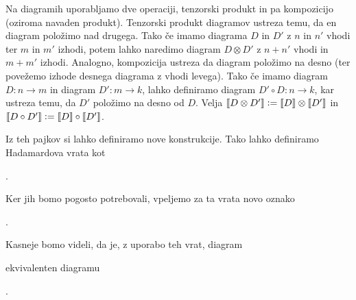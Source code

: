 \documentclass[mat1]{fmfdelo}
\newcommand{\interpret}[1]{\left\llbracket #1 \right\rrbracket}
\newcommand{\defeq}{\vcentcolon=}
\begin{document}
Na diagramih uporabljamo dve operaciji, tenzorski produkt in pa kompozicijo (oziroma navaden produkt). Tenzorski produkt diagramov ustreza temu, da en diagram položimo nad drugega. Tako če imamo diagrama \(D\) in \(D'\) z \(n\) in \(n'\) vhodi ter \(m\) in \(m'\) izhodi, potem lahko naredimo diagram \(D\otimes D'\) z \(n+n'\) vhodi in \(m+m'\) izhodi. Analogno, kompozicija ustreza da diagram položimo na desno (ter povežemo izhode desnega diagrama z vhodi levega). Tako če imamo diagram \(D:n\to m\) in diagram \(D':m\to k\), lahko definiramo diagram \(D'\circ D: n\to k\), kar ustreza temu, da \(D'\) položimo na desno od \(D\). Velja \(\interpret{D\otimes D'}\defeq \interpret{D} \otimes \interpret{D'}\) in \(\interpret{D\circ D'} \defeq \interpret{D}\circ \interpret{ D'}\).

Iz teh pajkov si lahko definiramo nove konstrukcije. Tako lahko definiramo Hadamardova vrata kot
\begin{center}
    .
\end{center}
Ker jih bomo pogosto potrebovali, vpeljemo za ta vrata novo oznako
\begin{center}
    .
\end{center}
Kasneje bomo videli, da je, z uporabo teh vrat, diagram
\begin{center}
\end{center}
ekvivalenten diagramu
\begin{center}
    .
\end{center}
\end{document}
